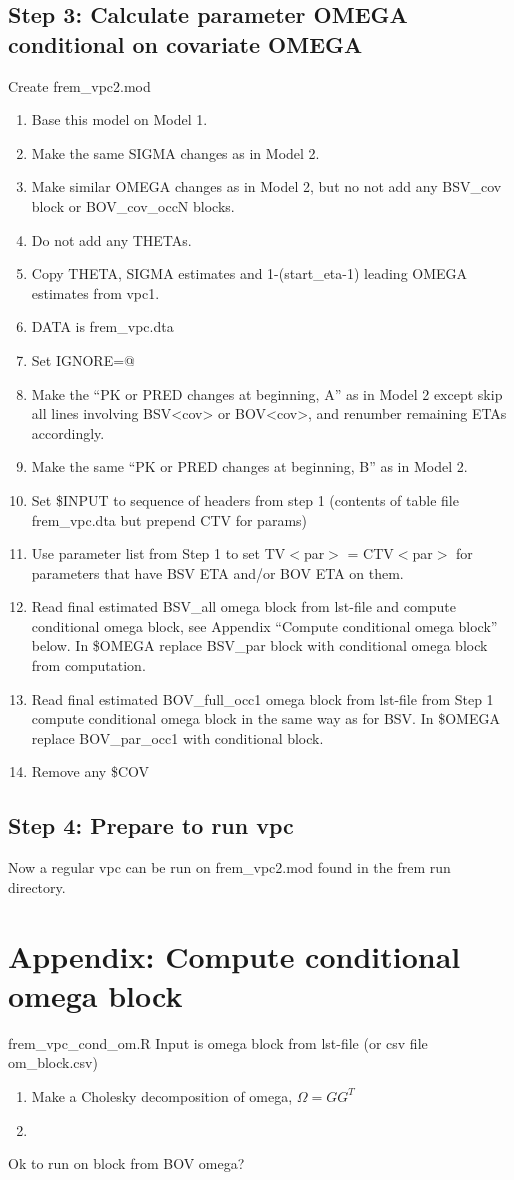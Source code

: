 \subsection{Step 3:  Calculate parameter OMEGA conditional on covariate OMEGA}
Create frem\_vpc2.mod
\begin{enumerate}
	\item Base this model on Model 1.
    \item Make the same SIGMA changes as in Model 2. 
    \item Make similar OMEGA changes as in Model 2, but no not add any BSV\_cov block or BOV\_cov\_occN blocks.
    \item Do not add any THETAs.
    \item Copy THETA, SIGMA estimates and 1-(start\_eta-1) leading OMEGA estimates from vpc1.
	\item DATA is frem\_vpc.dta
	\item Set IGNORE=@ 
    \item Make the ``PK or PRED changes at beginning, A'' as in Model 2 except skip all lines involving BSV<cov> or
    BOV<cov>, and renumber remaining ETAs accordingly.
    \item Make the same ``PK or PRED changes at beginning, B'' as in Model 2.
	\item Set \$INPUT to sequence of headers from step 1 (contents of table file frem\_vpc.dta but prepend CTV for params)
	\item Use parameter list from Step 1 to set TV$<$par$>$ = CTV$<$par$>$ for 
parameters that have BSV ETA and/or BOV ETA on them.
	\item Read final estimated BSV\_all omega block from lst-file and compute conditional omega block, 
    see Appendix “Compute conditional omega block” below. In \$OMEGA replace BSV\_par block with 
    conditional omega block from computation.
	\item Read final estimated BOV\_full\_occ1 omega block from lst-file from Step 1 compute conditional omega block 
    in the same way as for BSV. In \$OMEGA replace BOV\_par\_occ1 with conditional block.
    \item Remove any \$COV
\end{enumerate}

\subsection{Step 4: Prepare to run  vpc}
Now a regular vpc can be run on frem\_vpc2.mod found in the frem run directory.

 

\section{Appendix: Compute conditional omega block}
frem\_vpc\_cond\_om.R
Input is omega block from lst-file (or csv file om\_block.csv) 
\begin{enumerate}
\item Make a Cholesky decomposition of omega, $\Omega=GG^T$
\item
\end{enumerate}
Ok to run on block from BOV omega?



